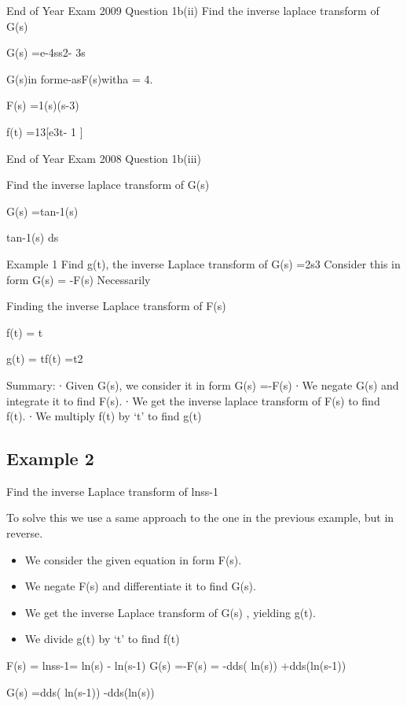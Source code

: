 End of Year Exam  2009 Question 1b(ii)
Find the inverse laplace transform of G(s)

G(s) =e-4ss2- 3s


G(s)in forme-asF(s)witha = 4.


F(s) =1(s)(s-3)


f(t) =13[e3t- 1 ]

End of Year Exam  2008 Question 1b(iii)

Find the inverse laplace transform of G(s)

G(s) =tan-1(s)

tan-1(s) ds


Example 1
Find g(t), the inverse Laplace transform of G(s) =2s3
Consider this in form G(s) = -F(s)
Necessarily 
 
Finding the inverse Laplace transform of F(s)
 
f(t) = t
 

g(t) = tf(t) =t2
 
Summary:
∙       Given G(s), we consider it in form G(s) =-F(s)
∙       We negate G(s) and integrate it to find F(s).
∙       We get the inverse laplace transform of F(s) to find f(t).
∙       We multiply f(t) by ‘t’ to find g(t)
 
\newpage
\subsection*{Example 2}
Find the inverse Laplace transform of lnss-1
 
To solve this we use a same approach to the one in the previous example, but in reverse.
\begin{itemize}
\item       We consider the given equation in form F(s).
\item      We negate F(s) and differentiate it to find G(s).
\item       We get the inverse Laplace transform of G(s) , yielding g(t).
\item      We divide g(t) by ‘t’ to find f(t)
\end{itemize}

 F(s) = lnss-1= ln(s) - ln(s-1)      	 
G(s) =-F(s) = -dds( ln(s)) +dds(ln(s-1))

G(s) =dds( ln(s-1)) -dds(ln(s))

